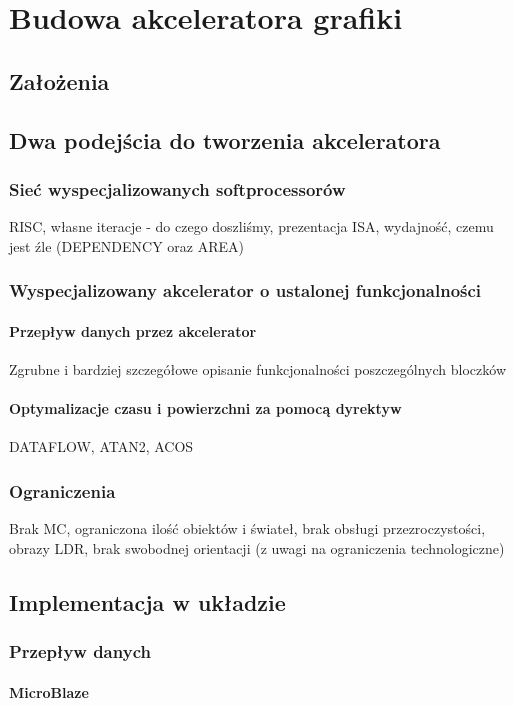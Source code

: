 \chapter{Budowa akceleratora grafiki}
\section{Założenia}

\section{Dwa podejścia do tworzenia akceleratora}
\subsection{Sieć wyspecjalizowanych softprocessorów}
RISC, własne iteracje - do czego doszliśmy, prezentacja ISA, wydajność, czemu jest źle (DEPENDENCY oraz AREA)
\subsection{Wyspecjalizowany akcelerator o ustalonej funkcjonalności}
\subsubsection{Przepływ danych przez akcelerator}
Zgrubne i bardziej szczegółowe opisanie funkcjonalności poszczególnych bloczków
\subsubsection{Optymalizacje czasu i powierzchni za pomocą dyrektyw}
DATAFLOW, ATAN2, ACOS

\subsection{Ograniczenia}
Brak MC, ograniczona ilość obiektów i świateł, brak obsługi przezroczystości, obrazy LDR, brak swobodnej orientacji (z uwagi na ograniczenia technologiczne)

\section{Implementacja w układzie}
\subsection{Przepływ danych}
\subsubsection{MicroBlaze}
